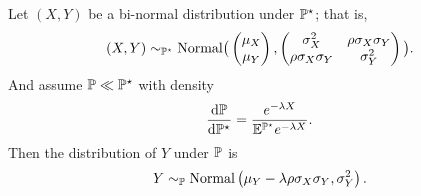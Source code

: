 \begin{lem}
	Let $(X,Y)$ be a bi-normal distribution under $\mathbb{P}^\star$; that is,
	$$(X,Y) \sim_{\mathbb{P}^\star} \mathrm{Normal}\big( \begin{pmatrix}
	\mu_X \\
	\mu_Y
	\end{pmatrix} , \begin{pmatrix}
	\sigma^2_X & \rho \sigma_X \sigma_Y \\
	\rho \sigma_X \sigma_Y & \sigma_Y^2
	\end{pmatrix} \big).$$ 
	And assume $\mathbb{P} \ll \mathbb{P}^\star$ with density
	$$\frac{\mathrm{d} \mathbb{P}}{\mathrm{d} \mathbb{P}^\star} = \frac{e^{-\lambda X}}{\mathbb{E}^{\mathbb{P}^\star} e^{-\lambda X} }.$$
	Then the distribution of $Y$ under $\mathbb{P}$ is
	$$Y \sim_{\mathbb{P}} \mathrm{Normal}\left(  \mu_Y -\lambda \rho\sigma_X \sigma_Y,  \sigma_Y^2  \right).$$
\end{lem}
